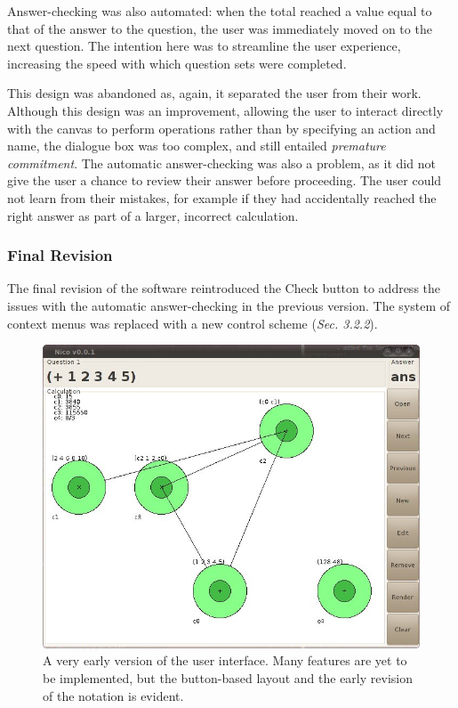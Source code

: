 \documentclass[12pt,twoside,notitlepage,xetex]{report}
\begin{document}
Answer-checking was also automated: when the total reached a value equal to that of the answer to the question, the user was immediately moved on to the next question.  The intention here was to streamline the user experience, increasing the speed with which question sets were completed.

This design was abandoned as, again, it separated the user from their work.  Although this design was an improvement, allowing the user to interact directly with the canvas to perform operations rather than by specifying an action and name, the dialogue box was too complex, and still entailed \emph{premature commitment}.  The automatic answer-checking was also a problem, as it did not give the user a chance to review their answer before proceeding.  The user could not learn from their mistakes, for example if they had accidentally reached the right answer as part of a larger, incorrect calculation.

\subsubsection{Final Revision}

The final revision of the software reintroduced the {\sfapp Check} button to address the issues with the automatic answer-checking in the previous version.  The system of context menus was replaced with a new control scheme (\emph{Sec. 3.2.2}).

\begin{center}
\begin{figure}[H]
\begin{center}
\includegraphics[width=\textwidth-4cm]{figs/nico_screen_oldest.png}
\end{center}
\caption{A very early version of the user interface.  Many features are yet to be implemented, but the button-based layout and the early revision of the notation is evident.}
\label{fig:OldApps1}
\end{figure}
\end{center}
\end{document}
